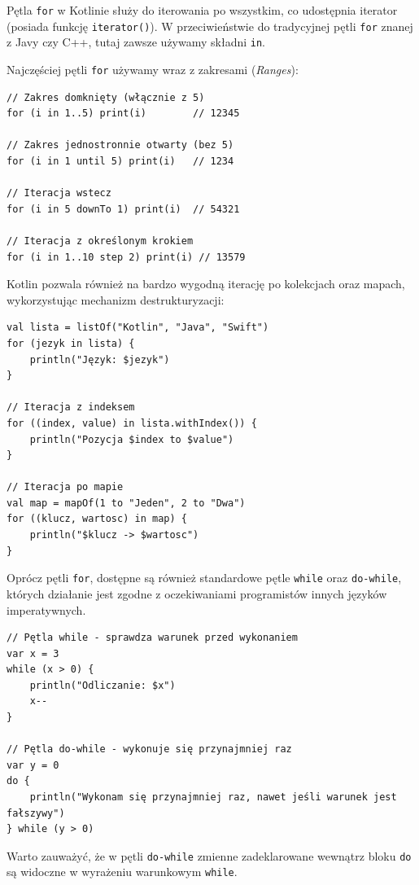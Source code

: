 Pętla \texttt{for} w Kotlinie służy do iterowania po wszystkim, co udostępnia iterator (posiada funkcję \texttt{iterator()}). W przeciwieństwie do tradycyjnej pętli \texttt{for} znanej z Javy czy C++, tutaj zawsze używamy składni \texttt{in}.

Najczęściej pętli \texttt{for} używamy wraz z zakresami (\textit{Ranges}):

\begin{verbatim}
// Zakres domknięty (włącznie z 5)
for (i in 1..5) print(i)        // 12345

// Zakres jednostronnie otwarty (bez 5)
for (i in 1 until 5) print(i)   // 1234

// Iteracja wstecz
for (i in 5 downTo 1) print(i)  // 54321

// Iteracja z określonym krokiem
for (i in 1..10 step 2) print(i) // 13579
\end{verbatim}

Kotlin pozwala również na bardzo wygodną iterację po kolekcjach oraz mapach, wykorzystując mechanizm destrukturyzacji:

\begin{verbatim}
val lista = listOf("Kotlin", "Java", "Swift")
for (jezyk in lista) {
    println("Język: $jezyk")
}

// Iteracja z indeksem
for ((index, value) in lista.withIndex()) {
    println("Pozycja $index to $value")
}

// Iteracja po mapie
val map = mapOf(1 to "Jeden", 2 to "Dwa")
for ((klucz, wartosc) in map) {
    println("$klucz -> $wartosc")
}
\end{verbatim}

Oprócz pętli \texttt{for}, dostępne są również standardowe pętle \texttt{while} oraz \texttt{do-while}, których działanie jest zgodne z oczekiwaniami programistów innych języków imperatywnych.

\begin{verbatim}
// Pętla while - sprawdza warunek przed wykonaniem
var x = 3
while (x > 0) {
    println("Odliczanie: $x")
    x--
}

// Pętla do-while - wykonuje się przynajmniej raz
var y = 0
do {
    println("Wykonam się przynajmniej raz, nawet jeśli warunek jest fałszywy")
} while (y > 0)
\end{verbatim}

Warto zauważyć, że w pętli \texttt{do-while} zmienne zadeklarowane wewnątrz bloku \texttt{do} są widoczne w wyrażeniu warunkowym \texttt{while}.

